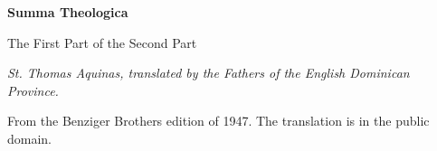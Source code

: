 \documentclass[11pt,letterpaper]{article}
\begin{document}
\color{ink}

\begin{titlepage}
\centering
\vspace*{4em}
{\LARGE\bfseries\color{heading} Summa Theologica\par}
\vspace{1.5em}
{\Large\color{subhead} The First Part of the Second Part\par}
\vspace{2.5em}
{\itshape\color{subhead} St. Thomas Aquinas, translated by the Fathers of
the English Dominican Province.\par}
\vfill
{\small From the Benziger Brothers edition of 1947. The translation is in
the public domain.\par}
\vspace{2em}
\end{titlepage}

\tableofcontents


\end{document}
